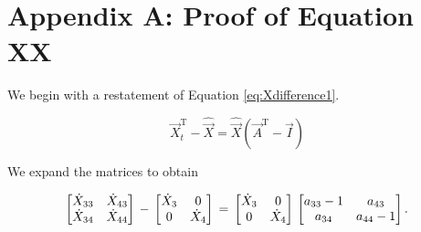 %
%
%

\appendix
\chapter{Appendix A: Proof of Equation XX}
\label{app:A} %


We begin with a restatement of Equation \ref{eq:Xdifference1}.

\begin{equation} \label{eq:Xdifference1Proof-1}
	\vec{X}_t^\mathrm{T} - \hat{\vec{X}} = \hat{\vec{X}}(\vec{A}^\mathrm{T} - \vec{I})
\end{equation}

\noindent We expand the matrices to obtain

\begin{equation} \label{eq:Xdifference1Proof-2}
\begin{bmatrix} 	\dot{X}_{33} & \dot{X}_{43}	\\
				\dot{X}_{34} & \dot{X}_{44}	\\
\end{bmatrix} \\
- \\
\begin{bmatrix} 	\dot{X}_{3} & 0	\\
				0 & \dot{X}_{4}	\\
\end{bmatrix} \\
= \\
\begin{bmatrix} 	\dot{X}_{3} & 0	\\
				0 & \dot{X}_{4}	\\
\end{bmatrix} \\
\begin{bmatrix} 	a_{33}-1 & a_{43}	\\
				a_{34} & a_{44}-1	\\
\end{bmatrix}.
\end{equation}

